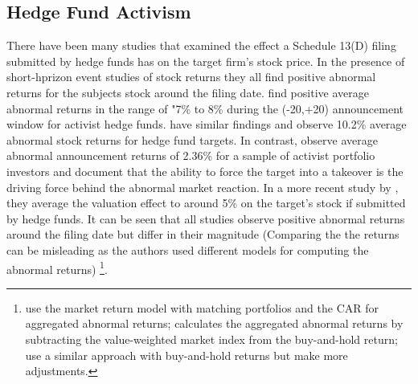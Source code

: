 \documentclass[12pt]{article}
\begin{document}
\subsection{Hedge Fund Activism}
There have been many studies that examined the effect a Schedule 13(D) filing submitted by hedge funds has on the target firm's stock price. In the presence of short-hprizon event studies of stock returns they all find positive abnormal returns for the subjects stock around the filing date. 
\citet[p.1730]{Brav2008} find positive average abnormal returns in the range of "7\% to 8\% during the (-20,+20) announcement window for activist hedge funds. \citet{Klein2009} have similar findings and observe 10.2\% average abnormal stock returns for hedge fund targets. In contrast, \citet{Greenwood2009} observe average abnormal announcement returns of 2.36\% for a sample of activist portfolio investors and document that the ability to force the target into a takeover is the driving force behind the abnormal market reaction. In a more recent study by \citet{Denes2017}, they average the valuation effect to around 5\% on the target's stock if submitted by hedge funds. It can be seen that all studies observe positive abnormal returns around the filing date but differ in their magnitude (Comparing the the returns can be misleading as the authors used different models for computing the abnormal returns)
	\footnote{\citet{Greenwood2009} use the market return model with matching portfolios and the CAR for aggregated abnormal returns; \citet{Brav2008} calculates the aggregated abnormal returns by subtracting the value-weighted market index from the buy-and-hold return; \citet{Klein2009} use a similar approach with buy-and-hold returns but make more adjustments.}.
\end{document}

